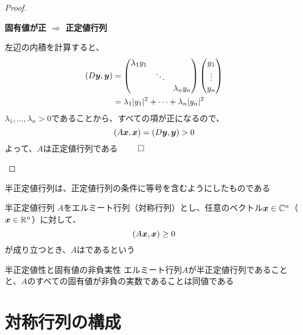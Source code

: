 \documentclass[../../../topic_linear-algebra]{subfiles}
\begin{document}
\begin{proof}
\begin{subpattern}{\bfseries 固有値が正 $\Longrightarrow$ 正定値行列}
    \br

    左辺の内積を計算すると、
    \begin{align*}
      (D\vb*{y}, \vb*{y}) & = \begin{pmatrix}
                                \lambda_1 y_1 &        &               \\
                                              & \ddots &               \\
                                              &        & \lambda_n y_n
                              \end{pmatrix} \begin{pmatrix}
                                              y_1    \\
                                              \vdots \\
                                              y_n
                                            \end{pmatrix}         \\
                          & = \lambda_1 |y_1|^2 + \cdots + \lambda_n |y_n|^2
    \end{align*}
    $\lambda_1,\ldots,\lambda_n > 0$であることから、すべての項が正になるので、
    \begin{equation*}
      (A\vb*{x}, \vb*{x}) = (D\vb*{y}, \vb*{y}) > 0
    \end{equation*}
    よって、$A$は正定値行列である $\qed$
  \end{subpattern}
\end{proof}

\br

半正定値行列は、正定値行列の条件に等号を含むようにしたものである

\begin{definition}{半正定値行列}
  $A$をエルミート行列（対称行列）とし、任意のベクトル$\vb*{x} \in \mathbb{C}^n$（$\vb*{x} \in \mathbb{R}^n$）に対して、
  \begin{equation*}
    (A\vb*{x}, \vb*{x}) \geq 0
  \end{equation*}
  が成り立つとき、$A$はであるという
\end{definition}

\begin{theorem}{半正定値性と固有値の非負実性}
  エルミート行列$A$が半正定値行列であることと、$A$のすべての固有値が非負の実数であることは同値である
\end{theorem}

\sectionline
\section{対称行列の構成}
\end{document}
